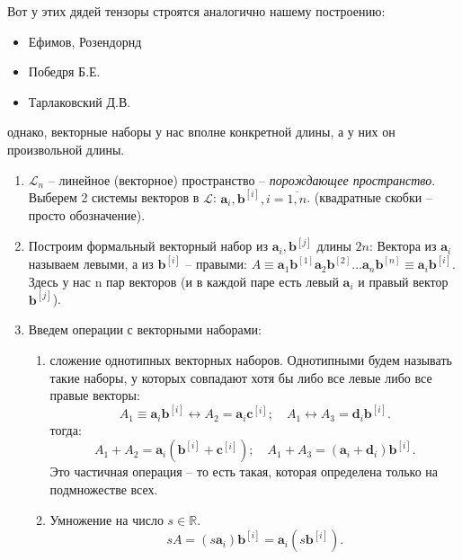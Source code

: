 Вот у этих дядей тензоры строятся аналогично нашему построению:
\begin{itemize}
  \item Ефимов, Розендорнд
  \item Победря Б.Е.
  \item Тарлаковский Д.В.
\end{itemize}
однако, векторные наборы у нас вполне конкретной длины, а у них он произвольной длины.

\begin{definition}
  \begin{enumerate}
    
    \item $\mathcal{L}_n$ -- линейное (векторное) пространство -- \emph{порождающее пространство}.
      Выберем 2 системы векторов в $\mathcal{L}$: $\mathbf{a}_i, \mathbf{b}^{[i]}, i = \overline{1, n}$.
      (квадратные скобки -- просто обозначение).

    \item Построим формальный векторный набор из $\mathbf{a}_i, \mathbf{b}^{[j]}$ длины $2n$:
      Вектора из $\mathbf{a}_i$ называем левыми, а из $\mathbf{b}^{[i]}$ -- правыми: 
      $A \equiv \mathbf{a}_1 \mathbf{b}^{[1]} \mathbf{a}_2 \mathbf{b}^{[2]} \dots \mathbf{a}_n \mathbf{b}^{[n]}
      \equiv \mathbf{a}_i \mathbf{b}^{[i]}$.
      Здесь у нас n пар векторов (и в каждой паре есть левый $\mathbf{a}_i$ и правый вектор
      $\mathbf{b}^{[j]}$).

    \item Введем операции с векторными наборами:
      \begin{enumerate}
        \item сложение однотипных векторных наборов. Однотипными будем называть такие наборы, у 
          которых совпадают хотя бы либо все левые либо все правые векторы:
          \[
            A_1 \equiv \mathbf{a}_i \mathbf{b}^{[i]} \leftrightarrow A_2 = \mathbf{a}_i \mathbf{c}^{[i]}; 
            \quad
            A_1 \leftrightarrow A_3 = \mathbf{d}_i \mathbf{b}^{[i]}.
          \]
          тогда:
          \[
            A_1+A_2 = \mathbf{a}_i (\mathbf{b}^{[i]} + \mathbf{c}^{[i]}); \quad
            A_1+A_3 = (\mathbf{a}_i + \mathbf{d}_i) \mathbf{b}^{[i]}.
          \]
          Это частичная операция -- то есть такая, которая определена только на подмножестве всех.

        \item Умножение на число $s \in \mathbb{R}$.
          \[
            sA = (s \mathbf{a}_i) \mathbf{b}^{[i]} = \mathbf{a}_i (s \mathbf{b}^{[i]}).
          \]
        

\end{enumerate}
\end{enumerate}
\end{definition}
